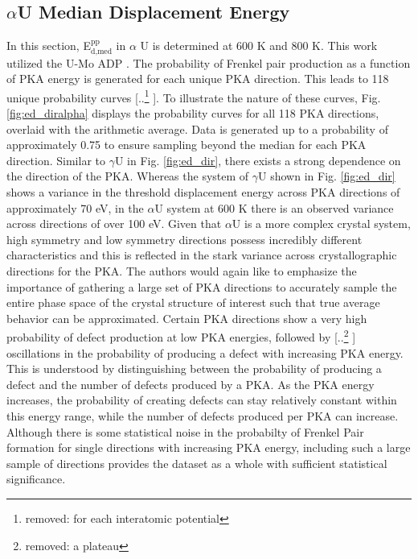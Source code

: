 \documentclass[review]{elsarticle}
\providecommand{\DIFaddtex}[1]{{\protect\color{blue} \sf #1}} %
\providecommand{\DIFdeltex}[1]{{\protect\color{red} [..\footnote{removed: #1} ]}} %
\providecommand{\DIFaddbegin}{} %
\providecommand{\DIFaddend}{} %
\providecommand{\DIFdelbegin}{} %
\providecommand{\DIFdelend}{} %
\providecommand{\DIFadd}[1]{\texorpdfstring{\DIFaddtex{#1}}{#1}} %
\providecommand{\DIFdel}[1]{\texorpdfstring{\DIFdeltex{#1}}{}} %
\newcommand{\DIFscaledelfig}{0.5}
\newlength{\DIFdelgraphicswidth} %
\newlength{\DIFdelgraphicsheight} %
\newcommand{\DIFaddincludegraphics}[2][]{{\color{blue}\fbox{\DIFOincludegraphics[#1]{#2}}}} %
\newcommand{\DIFdelincludegraphics}[2][]{%
\sbox{\DIFdelgraphicsbox}{\DIFOincludegraphics[#1]{#2}}%
\settoboxwidth{\DIFdelgraphicswidth}{\DIFdelgraphicsbox} %
\settoboxtotalheight{\DIFdelgraphicsheight}{\DIFdelgraphicsbox} %
\scalebox{\DIFscaledelfig}{%
\parbox[b]{\DIFdelgraphicswidth}{\usebox{\DIFdelgraphicsbox}\\[-\baselineskip] \rule{\DIFdelgraphicswidth}{0em}}\llap{\resizebox{\DIFdelgraphicswidth}{\DIFdelgraphicsheight}{%
\setlength{\unitlength}{\DIFdelgraphicswidth}%
\begin{picture}(1,1)%
\thicklines\linethickness{2pt} %
{\color[rgb]{1,0,0}\put(0,0){\framebox(1,1){}}}%
{\color[rgb]{1,0,0}\put(0,0){\line( 1,1){1}}}%
{\color[rgb]{1,0,0}\put(0,1){\line(1,-1){1}}}%
\end{picture}%
}\hspace*{3pt}}} %
} %
\DeclareRobustCommand{\DIFaddbegin}{\DIFOaddbegin \let\includegraphics\DIFaddincludegraphics} %
\DeclareRobustCommand{\DIFaddend}{\DIFOaddend \let\includegraphics\DIFOincludegraphics} %
\DeclareRobustCommand{\DIFdelbegin}{\DIFOdelbegin \let\includegraphics\DIFdelincludegraphics} %
\DeclareRobustCommand{\DIFdelend}{\DIFOaddend \let\includegraphics\DIFOincludegraphics} %
\begin{document}
\FloatBarrier

\subsection{$\alpha$U Median Displacement Energy}

In this section, E$^{\textrm{pp}}_{\textrm{d,med}}$ in $\alpha$ U is determined at 600 K and 800 K. This work utilized the U-Mo ADP \cite{smirnovaADP}. The probability of Frenkel pair production as a function of PKA energy is generated for each unique PKA direction. This leads to 118 unique probability curves\DIFdelbegin \DIFdel{for each interatomic potential}\DIFdelend . To illustrate the nature of these curves, Fig. \ref{fig:ed_diralpha} displays the probability curves for all 118 PKA directions, overlaid with the arithmetic average. Data is generated up to a probability of approximately 0.75 to ensure sampling beyond the median for each PKA direction. Similar to $\gamma$U in Fig. \ref{fig:ed_dir}, there exists a strong dependence on the direction of the PKA. Whereas the system of $\gamma$U shown in Fig. \ref{fig:ed_dir} shows a variance in the \DIFaddbegin \DIFadd{threshold }\DIFaddend displacement energy across PKA directions of approximately 70 eV, in the $\alpha$U system at 600 K there is an observed variance across directions of over 100 eV. Given that $\alpha$U is a more complex crystal system, high symmetry and low symmetry directions possess incredibly different characteristics and this is reflected in the stark variance across crystallographic directions for the PKA. The authors would again like to emphasize the importance of gathering a large set of PKA directions to accurately sample the entire phase space of the crystal structure of interest such that true average behavior can be approximated. Certain PKA directions show a very high probability of defect production at low PKA energies, followed by \DIFdelbegin \DIFdel{a plateau }\DIFdelend \DIFaddbegin \DIFadd{oscillations }\DIFaddend in the probability of producing a defect with increasing PKA energy. This is understood by distinguishing between the probability of producing a defect and the number of defects produced by a PKA. As the PKA energy increases, the probability of creating defects can stay relatively constant within this energy range, while the number of defects produced per PKA can increase. \DIFaddbegin \DIFadd{Although there is some statistical noise in the probabilty of Frenkel Pair formation for single directions with increasing PKA energy, including such a large sample of directions provides the dataset as a whole with sufficient statistical significance. 
}\DIFaddend 
\end{document}
